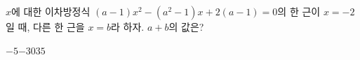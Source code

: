 $x$에 대한 이차방정식 $(a-1)x^2-(a^2-1)x+2(a-1)=0$의 한 근이 $x=-2$일 때, 다른 한 근을 $x=b$라 하자. $a+b$의 값은? 
\begin{choices32}{$-5$}{$-3$}{$0$}{$3$}{$5$}\end{choices32}
